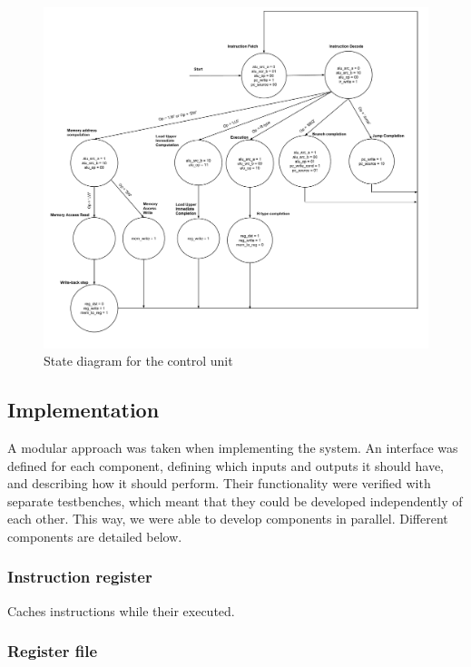 \begin{figure}[ht!]
    \begin{center}
    \includegraphics[width=\textwidth]{assets/state_machine.pdf}
    \caption{State diagram for the control unit}
    \label{fig:state_machine}
    \end{center}
\end{figure}

\subsection{Implementation}

A modular approach was taken when implementing the system.
An interface was defined for each component, defining which inputs and outputs it should have,
and describing how it should perform.
Their functionality were verified with separate testbenches, which meant that they could be developed independently of each other.
This way, we were able to develop components in parallel.
Different components are detailed below.

\subsubsection{Instruction register}

Caches instructions while their executed.

\subsubsection{Register file}


